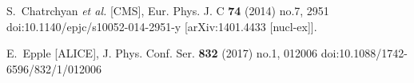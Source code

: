 \documentclass[aps,prd,%
 ]{revtex4}
\begin{document}
\begin{thebibliography}{9}
S.~Chatrchyan \textit{et al.} [CMS],
Eur. Phys. J. C \textbf{74} (2014) no.7, 2951
doi:10.1140/epjc/s10052-014-2951-y
[arXiv:1401.4433 [nucl-ex]].

E.~Epple [ALICE],
J. Phys. Conf. Ser. \textbf{832} (2017) no.1, 012006
doi:10.1088/1742-6596/832/1/012006
\end{thebibliography}
\end{document}
